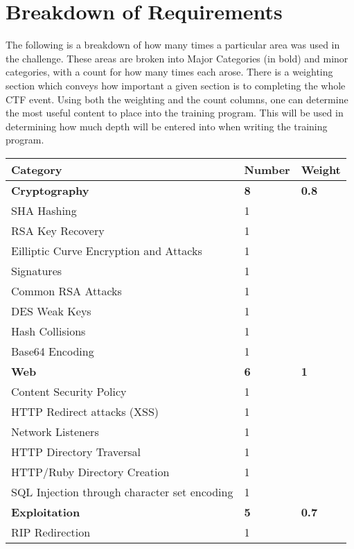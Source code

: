 \documentclass[a4paper,11pt]{report}
\begin{document}
	\section{Breakdown of Requirements}
	 	The following is a breakdown of how many times a particular area was used in the challenge. 
		These areas are broken into Major Categories (in bold) and minor categories, with a count for how many times each arose. 
		There is a weighting section which conveys how important a given section is to completing the whole CTF event. 
		Using both the weighting and the count columns, one can determine the most useful content to place into the training program. 
		This will be used in determining how much depth will be entered into when writing the training program. 	
		\begin{table}[htb]
			\centering
			\begin{tabular}{| l | l | l |}
				\hline
				\textbf{Category} & \textbf{Number} & \textbf{Weight} \\ \hline 
				\textbf{Cryptography} & \textbf{8} & \textbf{0.8}\\ \hline
				\quad SHA Hashing & 1 & \\ \hline 
				\quad RSA Key Recovery & 1 & \\ \hline
				\quad Eilliptic Curve Encryption and Attacks & 1 & \\ \hline
				\quad Signatures & 1 & \\ \hline 
				\quad Common RSA Attacks & 1 & \\ \hline
				\quad DES Weak Keys & 1 & \\ \hline 
				\quad Hash Collisions & 1 & \\ \hline 
				\quad Base64 Encoding & 1 & \\ \hline 
				\textbf{Web} & \textbf{6} & \textbf{1} \\ \hline 
				\quad Content Security Policy & 1 & \\ \hline 
				\quad HTTP Redirect attacks (XSS) & 1 & \\ \hline 
				\quad Network Listeners & 1 & \\ \hline 
				\quad HTTP Directory Traversal & 1 & \\ \hline 
				\quad HTTP/Ruby Directory Creation & 1 & \\ \hline 
				\quad SQL Injection through character set encoding & 1 & \\ \hline 
				\textbf{Exploitation} & \textbf{5} & \textbf{0.7} \\ \hline 
				\quad RIP Redirection & 1 & \\ \hline 

\end{tabular}
\end{table}
\end{document}
